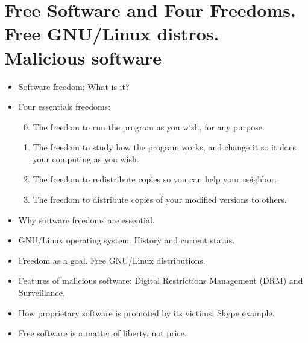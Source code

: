 \documentclass[twoside,openright]{report}
\begin{document}
\section[Free Software and Four Freedoms. Free GNU/Linux distros. Malicious software]{Free Software and Four Freedoms.\\ Free GNU/Linux distros.\\ Malicious software}
\begin{itemize}
 \item    Software freedom: What is it?
 \item    Four essentials freedoms:
\begin{enumerate}
\setcounter{enumi}{-1}
 \item        The freedom to run the program as you wish, for any purpose.
 \item        The freedom to study how the program works, and change it so it does your computing as you wish.
 \item        The freedom to redistribute copies so you can help your neighbor.
 \item        The freedom to distribute copies of your modified versions to others.
\end{enumerate}
 \item    Why software freedoms are essential.
 \item    GNU/Linux operating system. History and current status.
 \item    Freedom as a goal. Free GNU/Linux distributions.
 \item    Features of malicious software: Digital Restrictions Management (DRM) and Surveillance.   
 \item    How proprietary software is promoted by its victims: Skype example.
 \item    Free software is a matter of liberty, not price.
\end{itemize}
\end{document}
